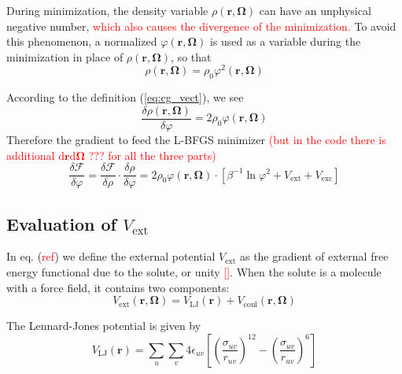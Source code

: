 During minimization, the density variable $\rho(\mathbf{r},\mathbf{\Omega})$
can have an unphysical negative number, \textcolor{red}{which also causes
the divergence of the minimization.} To avoid this phenomenon, a normalized
$\varphi(\mathbf{r},\mathbf{\Omega})$ is used as a variable during
the minimization in place of $\rho(\mathbf{r},\mathbf{\Omega})$,
so that
\begin{equation}
\rho(\mathbf{r},\mathbf{\Omega})=\rho_{0}\varphi^{2}(\mathbf{r},\mathbf{\Omega})\label{eq:cg_vect}
\end{equation}


According to the definition (\ref{eq:cg_vect}), we see
\begin{equation}
\frac{\delta\rho(\mathbf{r},\mathbf{\Omega})}{\delta\varphi}=2\rho_{0}\varphi(\mathbf{r},\mathbf{\Omega})
\end{equation}
Therefore the gradient to feed the L-BFGS minimizer \textcolor{red}{(but
in the code there is additional $\mathrm{d}\mathbf{r}\mathrm{d}\mathbf{\Omega}$
??? for all the three parts)}
\begin{equation}
\frac{\delta\mathcal{F}}{\delta\varphi}=\frac{\delta\mathcal{F}}{\delta\rho}\cdot\frac{\delta\rho}{\delta\varphi}=2\rho_{0}\varphi(\mathbf{r},\mathbf{\Omega})\cdot\left[\beta^{-1}\ln\varphi^{2}+V_{\mathrm{ext}}+V_{\mathrm{exc}}\right]
\end{equation}



\subsection{Evaluation of $V_{\mathrm{ext}}$}

In eq. (\textcolor{red}{ref}) we define the external potential $V_{\mathrm{ext}}$
as the gradient of external free energy functional due to the solute,
or unity \textcolor{red}{{[}{]}}. When the solute is a molecule with a
force field, it contains two components:
\begin{equation}
V_{\mathrm{ext}}(\mathbf{r},\mathbf{\Omega})=V_{\mathrm{LJ}}(\mathbf{r})+V_{\mathrm{coul}}(\mathbf{r},\mathbf{\Omega})
\end{equation}


The Lennard-Jones potential is given by
\begin{equation}
V_{\mathrm{LJ}}(\mathbf{r})=\sum_{u}\sum_{v}4\epsilon_{uv}\left[\left(\dfrac{\sigma_{uv}}{r_{uv}}\right)^{12}-\left(\dfrac{\sigma_{uv}}{r_{uv}}\right)^{6}\right]\label{eq:LJ}
\end{equation}



